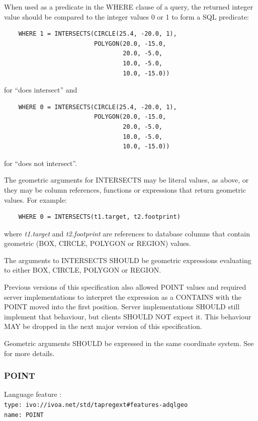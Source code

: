 \documentclass[11pt,a4paper]{ivoa}
\begin{document}
When used as a predicate in the WHERE clause of a query, the returned integer
value should be compared to the integer values 0 or 1 to form a SQL predicate:
\begin{verbatim}
    WHERE 1 = INTERSECTS(CIRCLE(25.4, -20.0, 1),
                         POLYGON(20.0, -15.0,
                                 20.0, -5.0,
                                 10.0, -5.0,
                                 10.0, -15.0))
\end{verbatim}
\noindent
for ``does intersect'' and
\begin{verbatim}
    WHERE 0 = INTERSECTS(CIRCLE(25.4, -20.0, 1),
                         POLYGON(20.0, -15.0,
                                 20.0, -5.0,
                                 10.0, -5.0,
                                 10.0, -15.0))
\end{verbatim}
\noindent
for ``does not intersect''.

The geometric arguments for INTERSECTS may be literal values, as above,
or they may be column references, functions or expressions that return
geometric values.
For example:
\begin{verbatim}
    WHERE 0 = INTERSECTS(t1.target, t2.footprint)
\end{verbatim}
where \textit{t1.target} and \textit{t2.footprint} are references to
database columns that contain geometric (BOX, CIRCLE, POLYGON or REGION) values.

The arguments to INTERSECTS SHOULD be geometric expressions evaluating to
either BOX, CIRCLE, POLYGON or REGION.

Previous versions of this specification also allowed POINT values and required
server implementations to interpret the expression as a CONTAINS with the POINT
moved into the first position. Server implementations SHOULD still implement
that behaviour, but clients SHOULD NOT expect it. This behaviour MAY be dropped
in the next major version of this specification.

Geometric arguments SHOULD be expressed in the same coordinate system.
See  for more details.

\subsubsection{POINT}
\label{sec:functions.geom.point}
{\footnotesize Language feature :}\\
{\footnotesize \verb|type: ivo://ivoa.net/std/tapregext#features-adqlgeo|}\\
{\footnotesize \verb|name: POINT|}\\
\end{document}

